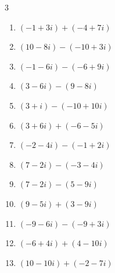 \begin{multicols}{3}
\begin{enumerate}
        \phantom{$\displaystyle =-6+2i$}

  \item $\displaystyle (-1+3i) + (-4+7i)$

        \phantom{$\displaystyle =-5+10i$}

  \item $\displaystyle (10-8i) - (-10+3i)$

        \phantom{$\displaystyle =20-11i$}

  \item $\displaystyle (-1-6i) - (-6+9i)$

        \phantom{$\displaystyle =5-15i$}

  \item $\displaystyle (3-6i) - (9-8i)$

        \phantom{$\displaystyle =-6+2i$}

  \item $\displaystyle (3+i) - (-10+10i)$

        \phantom{$\displaystyle =13-9i$}

  \item $\displaystyle (3+6i) + (-6-5i)$

        \phantom{$\displaystyle =-3+i$}

  \item $\displaystyle (-2-4i) - (-1+2i)$

        \phantom{$\displaystyle =-1-6i$}

  \item $\displaystyle (7-2i) - (-3-4i)$

        \phantom{$\displaystyle =10+2i$}

  \item $\displaystyle (7-2i) - (5-9i)$

        \phantom{$\displaystyle =2+7i$}

  \item $\displaystyle (9-5i) + (3-9i)$

        \phantom{$\displaystyle =12-14i$}

  \item $\displaystyle (-9-6i) - (-9+3i)$

        \phantom{$\displaystyle =-9i$}

  \item $\displaystyle (-6+4i) + (4-10i)$

        \phantom{$\displaystyle =-2-6i$}

  \item $\displaystyle (10-10i) + (-2-7i)$


\end{enumerate}
\end{multicols}
